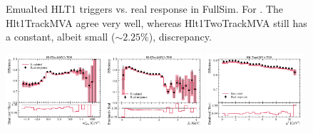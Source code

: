 \begin{figure}[ht]
    \caption{
        Emualted HLT1 triggers vs. real response in FullSim. For \Bp.
        The Hlt1TrackMVA agree very well, whereas Hlt1TwoTrackMVA still has a
        constant, albeit small ($\sim\!2.25$\%), discrepancy.
    }
    \label{fig:hlt1-trackmva-emu}
\end{figure}

\begin{figure}[ht]
    \centering
    \includegraphics[width=0.32\textwidth]{
        ./figs-mc-emulation/emulate-hlt1/b0_Hlt1TrackMVA_TOS_mmiss2.pdf
    }
    \includegraphics[width=0.32\textwidth]{
        ./figs-mc-emulation/emulate-hlt1/b0_Hlt1TrackMVA_TOS_el.pdf
    }
    \includegraphics[width=0.32\textwidth]{
        ./figs-mc-emulation/emulate-hlt1/b0_Hlt1TrackMVA_TOS_q2.pdf
    }


\end{figure}

